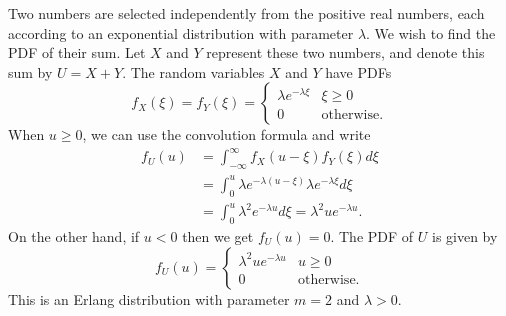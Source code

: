 \begin{example}
Two numbers are selected independently from the positive real numbers, each according to an exponential distribution with parameter $\lambda$. 
We wish to find the PDF of their sum.
Let $X$ and $Y$ represent these two numbers, and denote this sum by $U = X + Y$.
The random variables $X$ and $Y$ have PDFs
\begin{equation*}
f_X (\xi) = f_Y (\xi) = \begin{cases} \lambda e^{-\lambda \xi} & \xi \geq 0 \\
0 & \text{otherwise} . \end{cases}
\end{equation*}
When $u \geq 0$, we can use the convolution formula and write
\begin{equation*}
\begin{split}
f_U (u) &= \int_{-\infty}^{\infty} f_X(u - \xi) f_Y(\xi) d\xi \\
&= \int_0^u \lambda e^{-\lambda(u - \xi)} \lambda e^{-\lambda \xi} d\xi \\
&= \int_0^u \lambda^2 e^{-\lambda u} d\xi
= \lambda^2 u e^{-\lambda u}.
\end{split}
\end{equation*}
On the other hand, if $u < 0$ then we get $f_U(u) = 0$.
The PDF of $U$ is given by
\begin{equation*}
f_U (u) = \begin{cases} \lambda^2 u e^{-\lambda u} & u \geq 0 \\
0 & \text{otherwise} . \end{cases}
\end{equation*}
This is an Erlang distribution with parameter $m = 2$ and $\lambda > 0$.
\end{example}

